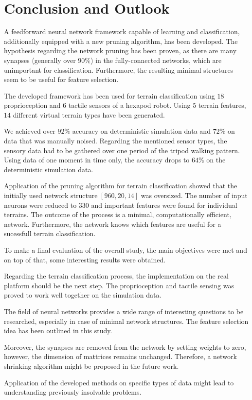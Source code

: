 \chapter{Conclusion and Outlook} \label{chap:conclusion}
A feedforward neural network framework capable of learning and classification, additionally equipped with a new pruning algorithm, has been developed. The hypothesis regarding the network pruning has been proven, as there are many synapses (generally over $ 90\% $) in the fully-connected networks, which are unimportant for classification. Furthermore, the resulting minimal structures seem to be useful for feature selection.

The developed framework has been used for terrain classification using $ 18 $ proprioception and $ 6 $ tactile sensors of a hexapod robot. Using $ 5 $ terrain features, $ 14 $ different virtual terrain types have been generated. 

We achieved over $ 92\% $ accuracy on deterministic simulation data and $ 72\% $ on data that was manually noised. Regarding the mentioned sensor types, the sensory data had to be gathered over one period of the tripod walking pattern. Using data of one moment in time only, the accuracy drops to $ 64\% $ on the deterministic simulation data.

Application of the pruning algorithm for terrain classification showed that the initially used network structure $ [960, 20, 14] $ was oversized. The number of input neurons were reduced to $ 330 $ and important features were found for individual terrains. The outcome of the process is a minimal, computationally efficient, network. Furthermore, the network knows which features are useful for a sucessfull terrain classification. 

To make a final evaluation of the overall study, the main objectives were met and on top of that, some interesting results were obtained. 

Regarding the terrain classification process, the implementation on the real platform should be the next step. The proprioception and tactile sensing was proved to work well together on the simulation data.

The field of neural networks provides a wide range of interesting questions to be researched, especially in case of minimal network structures. The feature selection idea has been outlined in this study. 

Moreover, the synapses are removed from the network by setting weights to zero, however, the dimension of mattrices remains unchanged. Therefore, a network shrinking algorithm might be proposed in the future work.

Application of the developed methods on specific types of data might lead to understanding previously insolvable problems.